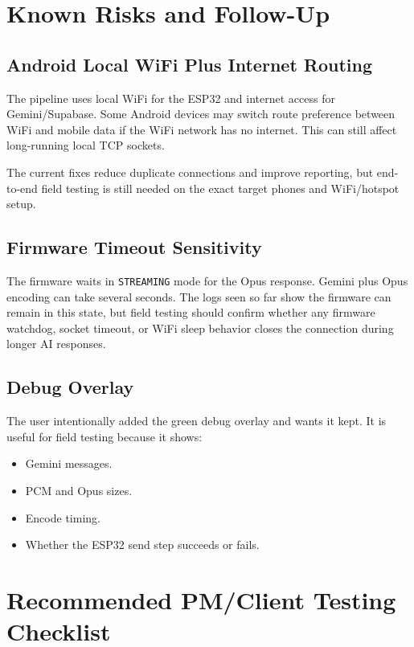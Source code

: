 \documentclass[11pt,a4paper]{article}
\begin{document}
\section{Known Risks and Follow-Up}

\subsection{Android Local WiFi Plus Internet Routing}

The pipeline uses local WiFi for the ESP32 and internet access for Gemini/Supabase. Some Android devices may switch route preference between WiFi and mobile data if the WiFi network has no internet. This can still affect long-running local TCP sockets.

The current fixes reduce duplicate connections and improve reporting, but end-to-end field testing is still needed on the exact target phones and WiFi/hotspot setup.

\subsection{Firmware Timeout Sensitivity}

The firmware waits in \texttt{STREAMING} mode for the Opus response. Gemini plus Opus encoding can take several seconds. The logs seen so far show the firmware can remain in this state, but field testing should confirm whether any firmware watchdog, socket timeout, or WiFi sleep behavior closes the connection during longer AI responses.

\subsection{Debug Overlay}

The user intentionally added the green debug overlay and wants it kept. It is useful for field testing because it shows:

\begin{itemize}[leftmargin=*]
  \item Gemini messages.
  \item PCM and Opus sizes.
  \item Encode timing.
  \item Whether the ESP32 send step succeeds or fails.
\end{itemize}

\section{Recommended PM/Client Testing Checklist}
\end{document}
